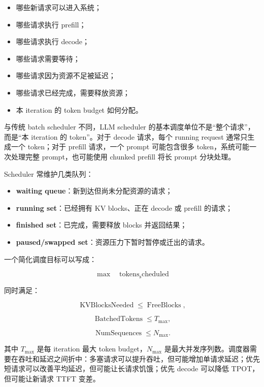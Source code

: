 \begin{itemize}
\item 哪些新请求可以进入系统；
\item 哪些请求执行 prefill；
\item 哪些请求执行 decode；
\item 哪些请求需要等待；
\item 哪些请求因为资源不足被延迟；
\item 哪些请求已经完成，需要释放资源；
\item 本 iteration 的 token budget 如何分配。
\end{itemize}

与传统 batch scheduler 不同，LLM scheduler 的基本调度单位不是“整个请求”，而是“本 iteration 的 token”。对于 decode 请求，每个 running request 通常只生成一个 token；对于 prefill 请求，一个 prompt 可能包含很多 token，系统可能一次处理完整 prompt，也可能使用 chunked prefill 将长 prompt 分块处理。

Scheduler 常维护几类队列：

\begin{itemize}
\item \textbf{waiting queue}：新到达但尚未分配资源的请求；
\item \textbf{running set}：已经拥有 KV blocks、正在 decode 或 prefill 的请求；
\item \textbf{finished set}：已完成，需要释放 blocks 并返回结果；
\item \textbf{paused/swapped set}：资源压力下暂时暂停或迁出的请求。
\end{itemize}

一个简化调度目标可以写成：

\[
\max
\quad
\operatorname{tokens_scheduled}
\]

同时满足：

\[
\operatorname{KVBlocksNeeded}
\le
\operatorname{FreeBlocks},
\]

\[
\operatorname{BatchedTokens}
\le
T_{\max},
\]

\[
\operatorname{NumSequences}
\le
N_{\max}.
\]

其中 $T_{\max}$ 是每 iteration 最大 token budget，$N_{\max}$ 是最大并发序列数。调度器需要在吞吐和延迟之间折中：多塞请求可以提升吞吐，但可能增加单请求延迟；优先短请求可以改善平均延迟，但可能让长请求饥饿；优先 decode 可以降低 TPOT，但可能让新请求 TTFT 变差。

